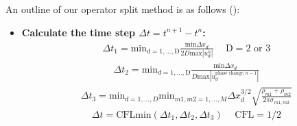 \documentclass[]{article}
\begin{document}
An outline of our operator split method is as 
follows 
(\cite{VAHAB2021}):
\begin{itemize}
\item \textbf{Calculate the time step $\Delta t=t^{n+1}-t^{n}$:}
  \begin{eqnarray*}
  \Delta t_{1}=\mbox{min}_{d=1,\ldots,\mbox{D}}
    \frac{\mbox{min}\Delta x_{d}}{2 D \mbox{max}|u_{d}^{n}|} 
    \hspace{15pt} \mbox{D}=2\mbox{ or }3
  \end{eqnarray*}
  \begin{eqnarray*}
  \Delta t_{2}=
    \mbox{min}_{d=1,\ldots,\mbox{D}}
    \frac{\mbox{min}\Delta x_{d}}{D\mbox{max}
    |u_{d}^{\mbox{phase change},n-1}|} 
  \end{eqnarray*}
  \begin{eqnarray}
  \Delta t_{3}=
  \mbox{min}_{d=1,\ldots,D}
  \mbox{min}_{m1,m2=1,\ldots,M}
    \Delta x_{d}^{3/2}
    \sqrt{\frac{\rho_{m1}+\rho_{m2}}
          {2\pi\sigma_{m1,m2}}} 
    \label{stiffconstraint}
  \end{eqnarray}
  \begin{eqnarray*}
  \Delta t=\mbox{CFL}\mbox{min}(
    \Delta t_{1},
    \Delta t_{2},
    \Delta t_{3}) \hspace{15pt} \mbox{CFL}=1/2
  \end{eqnarray*}
  

\end{itemize}
\end{document}
